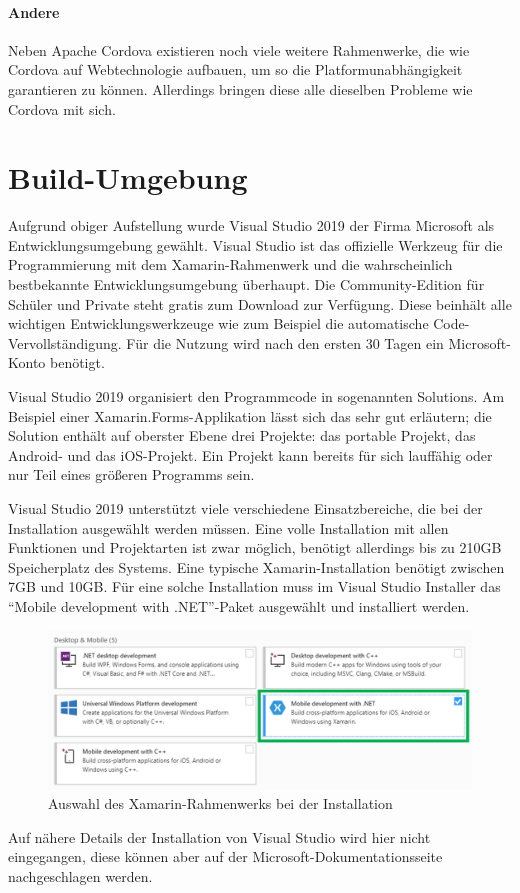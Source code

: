 \paragraph{Andere}
Neben Apache Cordova existieren noch viele weitere Rahmenwerke, die wie Cordova auf Webtechnologie aufbauen, um so die Platformunabhängigkeit garantieren zu können. Allerdings bringen diese alle dieselben Probleme wie Cordova mit sich.

\section{Build-Umgebung}
Aufgrund obiger Aufstellung wurde Visual Studio 2019 der Firma Microsoft als Entwicklungsumgebung gewählt.
Visual Studio ist das offizielle Werkzeug für die Programmierung mit dem Xamarin-Rahmenwerk und die wahrscheinlich bestbekannte Entwicklungsumgebung überhaupt.
Die Community-Edition für Schüler und Private steht gratis zum Download zur Verfügung.
Diese beinhält alle wichtigen Entwicklungswerkzeuge wie zum Beispiel die automatische Code-Vervollständigung.
Für die Nutzung wird nach den ersten 30 Tagen ein Microsoft-Konto benötigt.\par

Visual Studio 2019 organisiert den Programmcode in sogenannten Solutions.
Am Beispiel einer Xamarin.Forms-Applikation lässt sich das sehr gut erläutern;
die Solution enthält auf oberster Ebene drei Projekte: das portable Projekt, das Android- und das iOS-Projekt.
Ein Projekt kann bereits für sich lauffähig oder nur Teil eines größeren Programms sein.\par

Visual Studio 2019 unterstützt viele verschiedene Einsatzbereiche, die bei der Installation ausgewählt werden müssen.
Eine volle Installation mit allen Funktionen und Projektarten ist zwar möglich, benötigt allerdings bis zu 210GB Speicherplatz des Systems.
Eine typische Xamarin-Installation benötigt zwischen 7GB und 10GB.
Für eine solche Installation muss im Visual Studio Installer das \enquote{Mobile development with .NET}-Paket ausgewählt und installiert werden.
\begin{figure}[H]
    \centering\includegraphics[width=0.9\linewidth]{images/auswahl_rahmenwerk/installation.png}    
    \caption{Auswahl des Xamarin-Rahmenwerks bei der Installation}
\end{figure}
Auf nähere Details der Installation von Visual Studio wird hier nicht eingegangen, diese können aber auf der Microsoft-Dokumentationsseite \cite[vgl.][]{msdoc-vs-install} nachgeschlagen werden.
%
